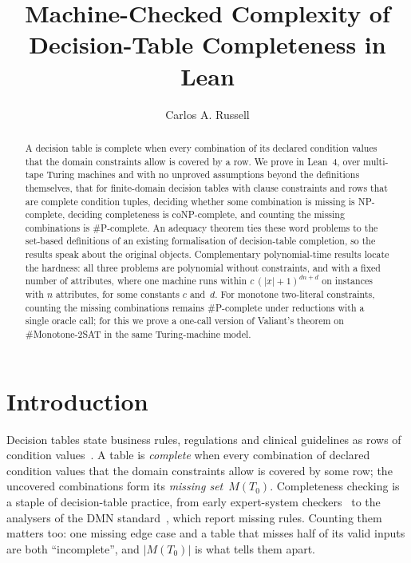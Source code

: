 \documentclass[a4paper,UKenglish,cleveref,autoref,thm-restate]{lipics-v2021}
\title{Machine-Checked Complexity of Decision-Table Completeness in Lean}
\author{Carlos A. Russell}{Independent Researcher, Buenos Aires, Argentina}{carlos.a.russell@gmail.com}{https://orcid.org/0009-0003-3741-0230}{}
\begin{document}
\maketitle

\begin{abstract}
A decision table is complete when every combination of its declared condition values that the
domain constraints allow is covered by a row. We prove in Lean~4, over multi-tape Turing
machines and with no unproved assumptions beyond the definitions themselves, that for finite-domain decision tables with clause
constraints and rows that are complete condition tuples, deciding whether some combination is
missing is NP-complete, deciding completeness is coNP-complete, and counting the missing
combinations is \#P-complete. An adequacy theorem
ties these word problems to the set-based definitions of an existing formalisation of
decision-table completion, so the results speak about the original objects. Complementary
polynomial-time results locate the hardness: all three problems are polynomial without
constraints, and with a fixed number of attributes, where one machine runs within
$c\,(|x|+1)^{dn+d}$ on instances with $n$ attributes, for some constants $c$ and~$d$. For monotone two-literal constraints,
counting the missing combinations remains \#P-complete under reductions with a single oracle
call; for this we prove a
one-call version of Valiant's theorem on \#Monotone-2SAT in the same Turing-machine model.
\end{abstract}

\section{Introduction}
\label{sec:intro}

Decision tables state business rules, regulations and clinical guidelines as rows of
condition values~\cite{PollackHicksHarrison1971}. A table is \emph{complete} when every combination of declared condition
values that the domain constraints allow is covered by some row; the uncovered combinations
form its \emph{missing set}~$M(T_0)$. Completeness checking is a staple of decision-table
practice, from early expert-system checkers~\cite{SuwaScottShortliffe1982} to the analysers of
the DMN standard~\cite{CalvaneseDLMMT2016}, which report missing rules. Counting them matters
too: one missing edge case and a table that misses half of its valid inputs are both
``incomplete'', and $|M(T_0)|$ is what tells them apart.
\end{document}
